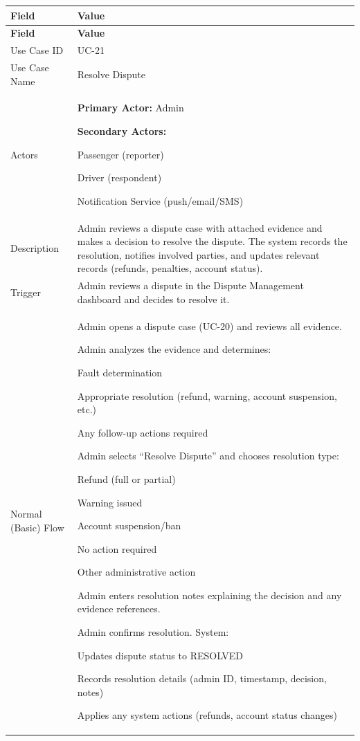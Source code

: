 \begin{longtable}{|p{3.5cm}|p{12cm}|}
\hline
\rowcolor{lightgray!30}
\textbf{Field} & \textbf{Value} \\
\hline
\endfirsthead
\hline
\rowcolor{lightgray!30}
\textbf{Field} & \textbf{Value} \\
\hline
\endhead
\hline
\endfoot
Use Case ID & UC-21 \\
\hline
Use Case Name & Resolve Dispute \\
\hline
Actors &
\textbf{Primary Actor:} Admin

\textbf{Secondary Actors:}

Passenger (reporter)

Driver (respondent)

Notification Service (push/email/SMS) \\
\hline
Description &
Admin reviews a dispute case with attached evidence and makes a decision to resolve the dispute. The system records the resolution, notifies involved parties, and updates relevant records (refunds, penalties, account status). \\
\hline
Trigger &
Admin reviews a dispute in the Dispute Management dashboard and decides to resolve it. \\
\hline
Normal (Basic) Flow &
Admin opens a dispute case (UC-20) and reviews all evidence.

Admin analyzes the evidence and determines:

Fault determination

Appropriate resolution (refund, warning, account suspension, etc.)

Any follow-up actions required

Admin selects “Resolve Dispute” and chooses resolution type:

Refund (full or partial)

Warning issued

Account suspension/ban

No action required

Other administrative action

Admin enters resolution notes explaining the decision and any evidence references.

Admin confirms resolution. System:

Updates dispute status to RESOLVED

Records resolution details (admin ID, timestamp, decision, notes)

Applies any system actions (refunds, account status changes)


\end{longtable}
